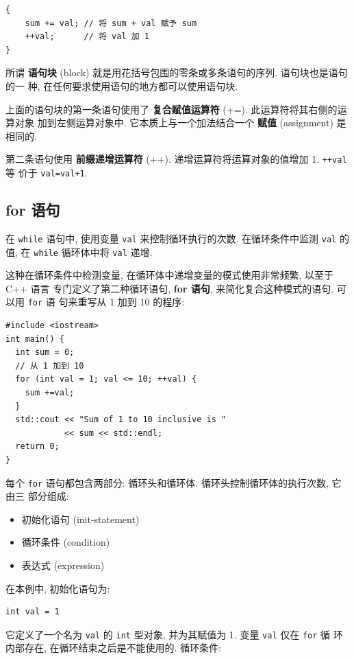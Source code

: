 \documentclass[lang=cn]{elegantbook}
\begin{document}
\begin{verbatim}
{
    sum += val; // 将 sum + val 赋予 sum
    ++val;      // 将 val 加 1
}
\end{verbatim}

所谓 \textbf{语句块} (block) 就是用花括号包围的零条或多条语句的序列. 语句块也是语句的一
种, 在任何要求使用语句的地方都可以使用语句块.

上面的语句块的第一条语句使用了 \textbf{复合赋值运算符} (+=). 此运算符将其右侧的运算对象
加到左侧运算对象中. 它本质上与一个加法结合一个 \textbf{赋值} (assignment) 是相同的.

第二条语句使用 \textbf{前缀递增运算符} (++). 递增运算符将运算对象的值增加 1. \texttt{++val} 等
价于 \texttt{val=val+1}.

\subsection{for 语句}
\label{sec:orged06265}

在 \texttt{while} 语句中, 使用变量 \texttt{val} 来控制循环执行的次数. 在循环条件中监测 \texttt{val} 的
值, 在 \texttt{while} 循环体中将 \texttt{val} 递增.

这种在循环条件中检测变量, 在循环体中递增变量的模式使用非常频繁, 以至于 C++ 语言
专门定义了第二种循环语句, \textbf{for 语句}, 来简化复合这种模式的语句. 可以用 \texttt{for} 语
句来重写从 1 加到 10 的程序:

\begin{verbatim}
#include <iostream>
int main() {
  int sum = 0;
  // 从 1 加到 10
  for (int val = 1; val <= 10; ++val) {
    sum +=val;
  }
  std::cout << "Sum of 1 to 10 inclusive is "
            << sum << std::endl;
  return 0;
}
\end{verbatim}

每个 \texttt{for} 语句都包含两部分: 循环头和循环体. 循环头控制循环体的执行次数, 它由三
部分组成:

\begin{itemize}
\item 初始化语句 (init-statement)
\item 循环条件 (condition)
\item 表达式 (expression)
\end{itemize}

在本例中, 初始化语句为:

\begin{verbatim}
int val = 1
\end{verbatim}

它定义了一个名为 \texttt{val} 的 \texttt{int} 型对象, 并为其赋值为 1. 变量 \texttt{val} 仅在 \texttt{for} 循
环内部存在, 在循环结束之后是不能使用的. 循环条件:
\end{document}

